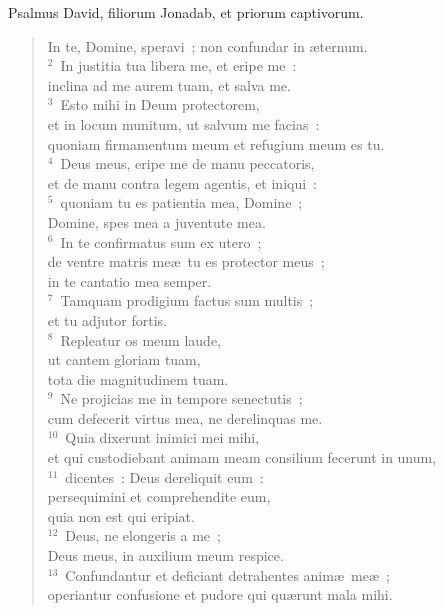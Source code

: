 \lettrine[lines=3,image=true,loversize=0.05,lraise=-0.03]{P}{}salmus David, filiorum Jonadab, et priorum captivorum. \begin{flushleft}\begin{verse}\vspace{6pt}In te, Domine, speravi~; non confundar in \ae ternum.\\
${}^{2}$~In justitia tua libera me, et eripe me~:\\ inclina ad me aurem tuam, et salva me.\\
${}^{3}$~Esto mihi in Deum protectorem,\\ et in locum munitum, ut salvum me facias~:\\ quoniam firmamentum meum et refugium meum es tu.\\
${}^{4}$~Deus meus, eripe me de manu peccatoris,\\ et de manu contra legem agentis, et iniqui~:\\
${}^{5}$~quoniam tu es patientia mea, Domine~;\\ Domine, spes mea a juventute mea.\\
${}^{6}$~In te confirmatus sum ex utero~;\\ de ventre matris me\ae\ tu es protector meus~;\\ in te cantatio mea semper.\\
${}^{7}$~Tamquam prodigium factus sum multis~;\\ et tu adjutor fortis.\\
${}^{8}$~Repleatur os meum laude,\\ ut cantem gloriam tuam,\\ tota die magnitudinem tuam.\\
${}^{9}$~Ne projicias me in tempore senectutis~;\\ cum defecerit virtus mea, ne derelinquas me.\\
${}^{10}$~Quia dixerunt inimici mei mihi,\\ et qui custodiebant animam meam consilium fecerunt in unum,\\
${}^{11}$~dicentes~: Deus dereliquit eum~:\\ persequimini et comprehendite eum,\\ quia non est qui eripiat.\\
${}^{12}$~Deus, ne elongeris a me~;\\ Deus meus, in auxilium meum respice.\\
${}^{13}$~Confundantur et deficiant detrahentes anim\ae\ me\ae~;\\ operiantur confusione et pudore qui qu\ae runt mala mihi.\\

\end{verse}
\end{flushleft}
